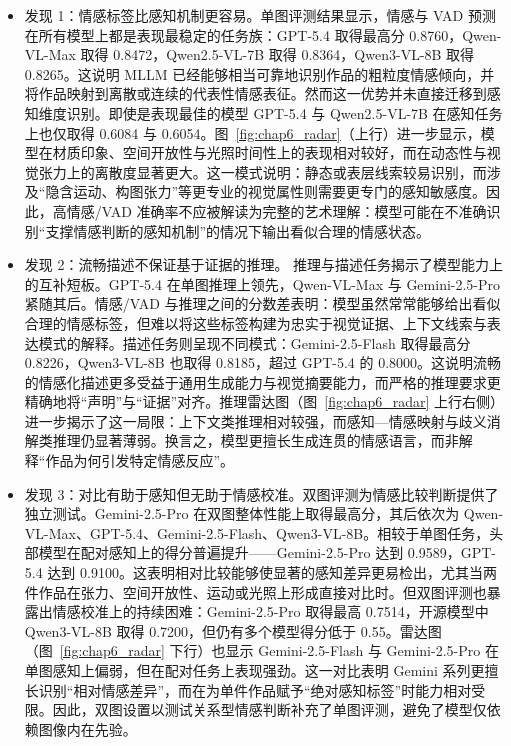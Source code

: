 \begin{itemize}
\item 发现 1：情感标签比感知机制更容易。单图评测结果显示，情感与 VAD 预测在所有模型上都是表现最稳定的任务族：GPT-5.4 取得最高分 0.8760，Qwen-VL-Max 取得 0.8472，Qwen2.5-VL-7B 取得 0.8364，Qwen3-VL-8B 取得 0.8265。这说明 MLLM 已经能够相当可靠地识别作品的粗粒度情感倾向，并将作品映射到离散或连续的代表性情感表征。然而这一优势并未直接迁移到感知维度识别。即使是表现最佳的模型 GPT-5.4 与 Qwen2.5-VL-7B 在感知任务上也仅取得 0.6084 与 0.6054。图~\ref{fig:chap6_radar}（上行）进一步显示，模型在材质印象、空间开放性与光照时间性上的表现相对较好，而在动态性与视觉张力上的离散度显著更大。这一模式说明：静态或表层线索较易识别，而涉及“隐含运动、构图张力”等更专业的视觉属性则需要更专门的感知敏感度。因此，高情感/VAD 准确率不应被解读为完整的艺术理解：模型可能在不准确识别“支撑情感判断的感知机制”的情况下输出看似合理的情感状态。

\item 发现 2：流畅描述不保证基于证据的推理。 推理与描述任务揭示了模型能力上的互补短板。GPT-5.4 在单图推理上领先，Qwen-VL-Max 与 Gemini-2.5-Pro 紧随其后。情感/VAD 与推理之间的分数差表明：模型虽然常常能够给出看似合理的情感标签，但难以将这些标签构建为忠实于视觉证据、上下文线索与表达模式的解释。描述任务则呈现不同模式：Gemini-2.5-Flash 取得最高分 0.8226，Qwen3-VL-8B 也取得 0.8185，超过 GPT-5.4 的 0.8000。这说明流畅的情感化描述更多受益于通用生成能力与视觉摘要能力，而严格的推理要求更精确地将“声明”与“证据”对齐。推理雷达图（图~\ref{fig:chap6_radar} 上行右侧）进一步揭示了这一局限：上下文类推理相对较强，而感知—情感映射与歧义消解类推理仍显著薄弱。换言之，模型更擅长生成连贯的情感语言，而非解释“作品为何引发特定情感反应”。

\item 发现 3：对比有助于感知但无助于情感校准。双图评测为情感比较判断提供了独立测试。Gemini-2.5-Pro 在双图整体性能上取得最高分，其后依次为 Qwen-VL-Max、GPT-5.4、Gemini-2.5-Flash、Qwen3-VL-8B。相较于单图任务，头部模型在配对感知上的得分普遍提升——Gemini-2.5-Pro 达到 0.9589，GPT-5.4 达到 0.9100。这表明相对比较能够使显著的感知差异更易检出，尤其当两件作品在张力、空间开放性、运动或光照上形成直接对比时。但双图评测也暴露出情感校准上的持续困难：Gemini-2.5-Pro 取得最高 0.7514，开源模型中 Qwen3-VL-8B 取得 0.7200，但仍有多个模型得分低于 0.55。雷达图（图~\ref{fig:chap6_radar} 下行）也显示 Gemini-2.5-Flash 与 Gemini-2.5-Pro 在单图感知上偏弱，但在配对任务上表现强劲。这一对比表明 Gemini 系列更擅长识别“相对情感差异”，而在为单件作品赋予“绝对感知标签”时能力相对受限。因此，双图设置以测试关系型情感判断补充了单图评测，避免了模型仅依赖图像内在先验。


\end{itemize}

